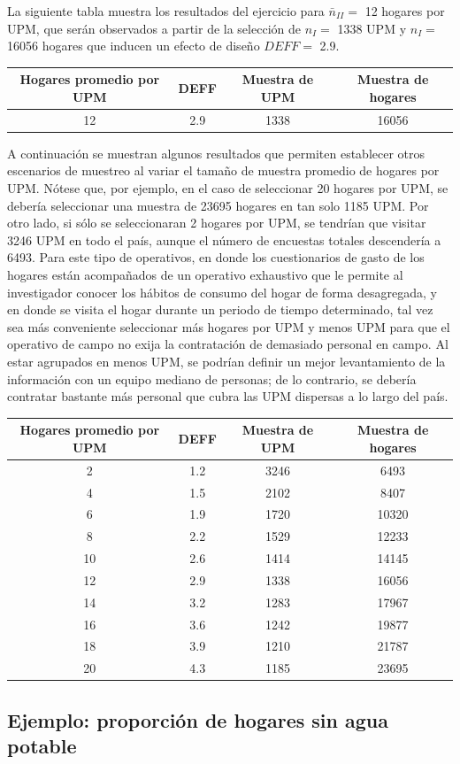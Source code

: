 La siguiente tabla muestra los resultados del ejercicio para \(\bar{n}_{II} =\) 12 hogares por UPM, que serán observados a partir de la selección de \(n_{I} =\) 1338 UPM y \(n_{I} =\) 16056 hogares que inducen un efecto de diseño \(DEFF =\) 2.9.

\begin{longtable}[]{@{}cccc@{}}
\toprule
Hogares promedio por UPM & DEFF & Muestra de UPM & Muestra de hogares\tabularnewline
\midrule
\endhead
12 & 2.9 & 1338 & 16056\tabularnewline
\bottomrule
\end{longtable}

A continuación se muestran algunos resultados que permiten establecer otros escenarios de muestreo al variar el tamaño de muestra promedio de hogares por UPM. Nótese que, por ejemplo, en el caso de seleccionar 20 hogares por UPM, se debería seleccionar una muestra de 23695 hogares en tan solo 1185 UPM. Por otro lado, si sólo se seleccionaran 2 hogares por UPM, se tendrían que visitar 3246 UPM en todo el país, aunque el número de encuestas totales descendería a 6493. Para este tipo de operativos, en donde los cuestionarios de gasto de los hogares están acompañados de un operativo exhaustivo que le permite al investigador conocer los hábitos de consumo del hogar de forma desagregada, y en donde se visita el hogar durante un periodo de tiempo determinado, tal vez sea más conveniente seleccionar más hogares por UPM y menos UPM para que el operativo de campo no exija la contratación de demasiado personal en campo. Al estar agrupados en menos UPM, se podrían definir un mejor levantamiento de la información con un equipo mediano de personas; de lo contrario, se debería contratar bastante más personal que cubra las UPM dispersas a lo largo del país.

\begin{longtable}[]{@{}cccc@{}}
\toprule
Hogares promedio por UPM & DEFF & Muestra de UPM & Muestra de hogares\tabularnewline
\midrule
\endhead
2 & 1.2 & 3246 & 6493\tabularnewline
4 & 1.5 & 2102 & 8407\tabularnewline
6 & 1.9 & 1720 & 10320\tabularnewline
8 & 2.2 & 1529 & 12233\tabularnewline
10 & 2.6 & 1414 & 14145\tabularnewline
12 & 2.9 & 1338 & 16056\tabularnewline
14 & 3.2 & 1283 & 17967\tabularnewline
16 & 3.6 & 1242 & 19877\tabularnewline
18 & 3.9 & 1210 & 21787\tabularnewline
20 & 4.3 & 1185 & 23695\tabularnewline
\bottomrule
\end{longtable}

\hypertarget{ejemplo-proporcion-de-hogares-sin-agua-potable}{%
\subsection{Ejemplo: proporción de hogares sin agua potable}\label{ejemplo-proporcion-de-hogares-sin-agua-potable}}

